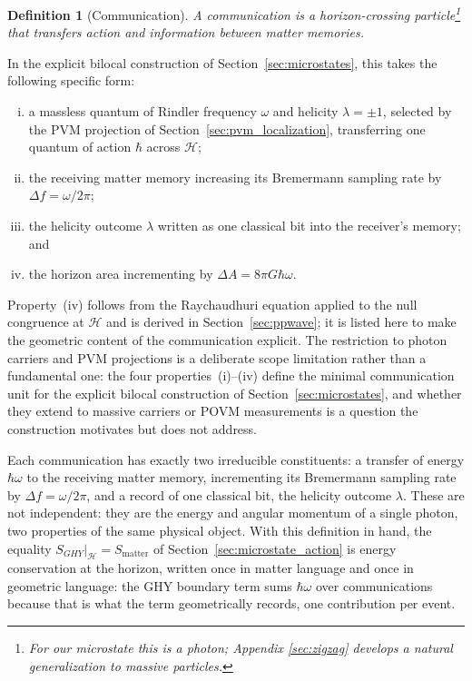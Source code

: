\documentclass[12pt,a4paper]{article}
\newtheorem{definition}{Definition}[section]
\begin{document}
\begin{definition}[Communication]
A communication is a horizon-crossing particle\footnote{For our microstate this is a photon; Appendix \ref{sec:zigzag} develops a natural generalization to massive particles.}
that transfers action and information between matter memories.
\end{definition}
In the explicit bilocal construction of 
Section~\ref{sec:microstates}, this takes the 
following specific form:
\begin{enumerate}[(i)]
\item a massless quantum of Rindler frequency 
$\omega$ and helicity $\lambda = \pm 1$, 
selected by the PVM projection of 
Section~\ref{sec:pvm_localization}, 
transferring one quantum of action $\hbar$ 
across $\mathcal{H}$;
\item the receiving matter memory increasing its 
  Bremermann sampling rate by $\Delta f = \omega / 2\pi$;
\item the helicity outcome $\lambda$ written as 
  one classical bit into the receiver's memory; and
\item the horizon area incrementing by 
  $\Delta A = 8\pi G \hbar\omega$.
\end{enumerate}
Property~(iv) follows from the Raychaudhuri equation 
applied to the null congruence at $\mathcal{H}$ and 
is derived in Section~\ref{sec:ppwave}; it is listed 
here to make the geometric content of the communication 
explicit.
The restriction to photon carriers and PVM projections 
is a deliberate scope limitation rather than a 
fundamental one: the four properties~(i)--(iv) define 
the minimal communication unit for the explicit 
bilocal construction of 
Section~\ref{sec:microstates}, and whether they 
extend to massive carriers or POVM measurements 
is a question the construction motivates but 
does not address.

Each communication has exactly two irreducible 
constituents: a transfer of energy $\hbar\omega$ 
to the receiving matter memory, incrementing its 
Bremermann sampling rate by $\Delta f = \omega/2\pi$, 
and a record of one classical bit, the helicity 
outcome $\lambda$. These are not independent: they 
are the energy and angular momentum of a single 
photon, two properties of the same physical object.
With this definition 
in hand, the equality $S_{GHY}|_{\mathcal{H}} = S_{\mathrm{matter}}$ 
of Section~\ref{sec:microstate_action} is energy conservation 
at the horizon, written once in matter language and once in 
geometric language: the GHY boundary term 
sums $\hbar\omega$ over communications because that 
is what the term geometrically records, one 
contribution per event.
\end{document}
